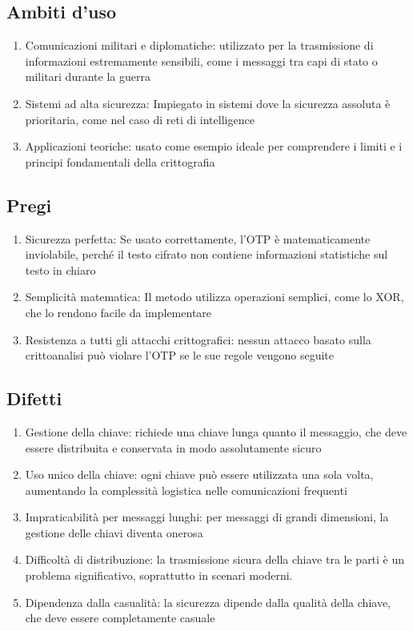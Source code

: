 \documentclass[10pt,oneside,a4paper]{article}
\begin{document}
\subsection{Ambiti d'uso}
\begin{enumerate}
\item Comunicazioni militari e diplomatiche: utilizzato per la trasmissione di informazioni estremamente sensibili, come i messaggi tra capi di stato o militari durante la guerra
\item Sistemi ad alta sicurezza: Impiegato in sistemi dove la sicurezza assoluta è prioritaria, come nel caso di reti di intelligence
\item Applicazioni teoriche: usato come esempio ideale per comprendere i limiti e i principi fondamentali della crittografia
\end{enumerate}
\subsection{Pregi}
\begin{enumerate}
\item Sicurezza perfetta: Se usato correttamente, l'OTP è matematicamente inviolabile, perché il testo cifrato non contiene informazioni statistiche sul testo in chiaro
\item Semplicità matematica: Il metodo utilizza operazioni semplici, come lo XOR, che lo rendono facile da implementare
\item Resistenza a tutti gli attacchi crittografici: nessun attacco basato sulla crittoanalisi può violare l'OTP se le sue regole vengono seguite
\end{enumerate}
\subsection{Difetti}
\begin{enumerate}
\item Gestione della chiave: richiede una chiave lunga quanto il messaggio, che deve essere distribuita e conservata in modo assolutamente sicuro
\item Uso unico della chiave: ogni chiave può essere utilizzata una sola volta, aumentando la complessità logistica nelle comunicazioni frequenti
\item Impraticabilità per messaggi lunghi: per messaggi di grandi dimensioni, la gestione delle chiavi diventa onerosa
\item Difficoltà di distribuzione: la trasmissione sicura della chiave tra le parti è un problema significativo, soprattutto in scenari moderni.
\item Dipendenza dalla casualità: la sicurezza dipende dalla qualità della chiave, che deve essere completamente casuale
\end{enumerate}
\end{document}
